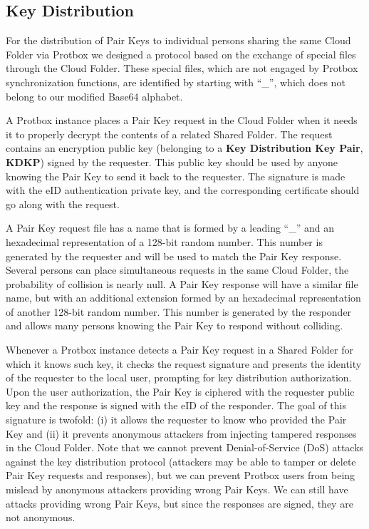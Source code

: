 \documentclass[english]{lni}
\newcommand\protbox{Protbox}
\newcommand\SharedF{Shared Folder}
\newcommand\CloudF{Cloud Folder}
\newcommand\PairKey{Pair Key}
\newcommand\PairKeys{Pair Keys}
\begin{document}
\subsection{Key Distribution}

For the distribution of {\PairKeys} to individual persons sharing the
same {\CloudF} via {\protbox} we designed a protocol based on the
exchange of special files through the {\CloudF}. These special
files, which are not engaged by {\protbox} synchronization functions,
are identified by starting with ``\_'', which does not belong to
our modified Base64 alphabet.

A {\protbox} instance places a {\PairKey} request in the {\CloudF}
when it needs it to properly decrypt the contents of a related
{\SharedF}. The request contains an encryption public key
(belonging to a \textbf{Key Distribution Key Pair}, \textbf{KDKP})
signed by the requester. This public key should be used by anyone
knowing the {\PairKey} to send it back to the requester. The
signature is made with the eID authentication private key, and the
corresponding certificate should go along with the request.



A {\PairKey} request file has a name that is formed by a leading ``\_''
and an hexadecimal representation of a 128-bit random number. This
number is generated by the requester and will be used to match the
{\PairKey} response. Several persons can place simultaneous requests
in the same {\CloudF}, the probability of collision is nearly
null. A {\PairKey} response will have a similar file name, but with
an additional extension formed by an hexadecimal representation
of another 128-bit random number. This number is generated by the
responder and allows many persons knowing the {\PairKey} to
respond without colliding.

Whenever a {\protbox} instance detects a {\PairKey} request in a {\SharedF}
for which it knows such key, it checks the request signature
and presents the identity of the requester to the local user,
prompting for key distribution authorization. Upon the user
authorization, the {\PairKey}
is ciphered with
the requester public key and the response is signed with the eID
of the responder. The goal of this signature is twofold: (i) it
allows the requester to know who provided the {\PairKey} and (ii) it
prevents anonymous attackers from injecting tampered responses in
the {\CloudF}. Note that we cannot prevent Denial-of-Service
(DoS) attacks against the key distribution protocol (attackers may
be able to tamper or delete {\PairKey} requests and responses), but we
can prevent {\protbox} users from being mislead by anonymous
attackers providing wrong {\PairKeys}. We can still have attacks
providing wrong {\PairKeys}, but since the responses are signed, they
are not anonymous.
\end{document}
